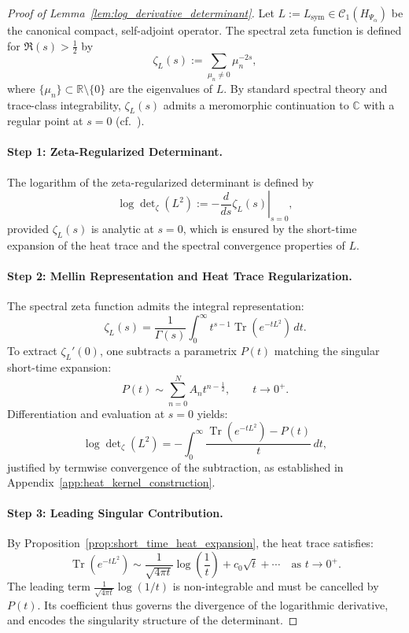 \begin{proof}[Proof of Lemma~\ref{lem:log_derivative_determinant}]
Let \( L := L_{\mathrm{sym}} \in \mathcal{C}_1(H_{\Psi_\alpha}) \) be the canonical compact, self-adjoint operator. The spectral zeta function is defined for \( \Re(s) > \tfrac{1}{2} \) by
\[
\zeta_L(s) := \sum_{\mu_n \neq 0} \mu_n^{-2s},
\]
where \( \{ \mu_n \} \subset \mathbb{R} \setminus \{0\} \) are the eigenvalues of \( L \). By standard spectral theory and trace-class integrability, \( \zeta_L(s) \) admits a meromorphic continuation to \( \mathbb{C} \) with a regular point at \( s = 0 \) (cf.~\cite[Ch.~3]{Simon2005TraceIdeals}).

\paragraph{Step 1: Zeta-Regularized Determinant.}
The logarithm of the zeta-regularized determinant is defined by
\[
\log \det\nolimits_\zeta(L^2) := -\left. \frac{d}{ds} \zeta_L(s) \right|_{s=0},
\]
provided \( \zeta_L(s) \) is analytic at \( s = 0 \), which is ensured by the short-time expansion of the heat trace and the spectral convergence properties of \( L \).

\paragraph{Step 2: Mellin Representation and Heat Trace Regularization.}
The spectral zeta function admits the integral representation:
\[
\zeta_L(s) = \frac{1}{\Gamma(s)} \int_0^\infty t^{s - 1} \operatorname{Tr}(e^{-t L^2}) \, dt.
\]
To extract \( \zeta_L'(0) \), one subtracts a parametrix \( P(t) \) matching the singular short-time expansion:
\[
P(t) \sim \sum_{n=0}^{N} A_n t^{n - \frac{1}{2}}, \qquad t \to 0^+.
\]
Differentiation and evaluation at \( s = 0 \) yields:
\[
\log \det\nolimits_\zeta(L^2)
= -\int_0^\infty \frac{\operatorname{Tr}(e^{-t L^2}) - P(t)}{t} \, dt,
\]
justified by termwise convergence of the subtraction, as established in Appendix~\ref{app:heat_kernel_construction}.

\paragraph{Step 3: Leading Singular Contribution.}
By Proposition~\ref{prop:short_time_heat_expansion}, the heat trace satisfies:
\[
\operatorname{Tr}(e^{-t L^2}) \sim \frac{1}{\sqrt{4\pi t}} \log\left( \frac{1}{t} \right) + c_0 \sqrt{t} + \cdots \quad \text{as } t \to 0^+.
\]
The leading term \( \frac{1}{\sqrt{4\pi t}} \log(1/t) \) is non-integrable and must be cancelled by \( P(t) \). Its coefficient thus governs the divergence of the logarithmic derivative, and encodes the singularity structure of the determinant.


\end{proof}
